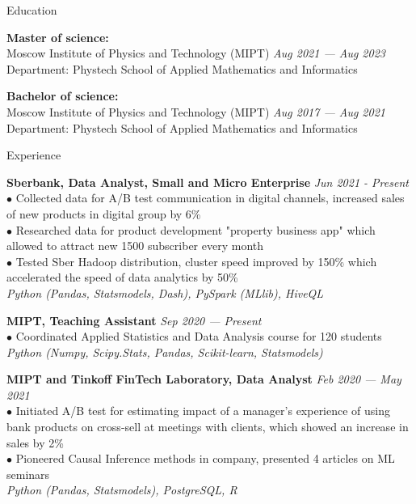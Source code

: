 \documentclass{resume} %
\begin{document}
\begin{rSection}{ Education }

{\bf Master of science:} \\
{Moscow Institute of Physics and Technology (MIPT)} \hfill {\em Aug 2021 — Aug 2023} \\ 
{Department:} {Phystech School of Applied Mathematics and Informatics}

{\bf Bachelor of science:} \\
{Moscow Institute of Physics and Technology (MIPT)} \hfill {\em Aug 2017 — Aug 2021} \\ 
{Department:} {Phystech School of Applied Mathematics and Informatics}

\end{rSection}

\begin{rSection}{ Experience }

    { \bf Sberbank, Data Analyst, Small and Micro Enterprise} \hfill {\em Jun 2021 - Present}\\
    { $\bullet$ Collected data for A/B test communication in digital channels, increased sales of new products in digital group by 6\% }\\
    { $\bullet$ Researched data for product development "property business app" which allowed to attract new 1500 subscriber every month }\\
    { $\bullet$ Tested Sber Hadoop distribution, cluster speed improved by 150\% which accelerated the speed of data analytics by 50\%}\\
    { \it Python (Pandas, Statsmodels, Dash), PySpark (MLlib), HiveQL}
    
    { \bf MIPT, Teaching Assistant} \hfill {\em Sep 2020 — Present}\\
    { $\bullet$ Coordinated Applied Statistics and Data Analysis course for 120 students}\\
    { \it Python (Numpy, Scipy.Stats, Pandas, Scikit-learn, Statsmodels) }
    
    { \bf MIPT and Tinkoff FinTech Laboratory, Data Analyst } \hfill {\em Feb 2020 — May 2021}\\
    { $\bullet$ Initiated A/B test for estimating impact of a manager's experience of using bank products on cross-sell at meetings with clients, which showed an increase in sales by 2\% }\\
    { $\bullet$ Pioneered Causal Inference methods in company, presented 4 articles on ML seminars  } \\
    { \it Python (Pandas, Statsmodels), PostgreSQL, R }
    

\end{rSection}
\end{document}
